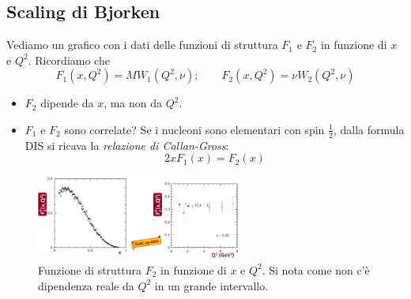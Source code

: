 \subsection{Scaling di Bjorken}
Vediamo un grafico con i dati delle funzioni di struttura $F_1$ e $F_2$ in funzione di $x$ e $Q^2$. Ricordiamo che 
\begin{equation*}
F_1(x,Q^2)=MW_1(Q^2,\nu);\qquad F_2(x,Q^2)=\nu W_2(Q^2,\nu)
\end{equation*}
\begin{itemize}
    \item $F_2$ dipende da $x$, ma non da $Q^2$.
    \item $F_1$ e $F_2$ sono correlate? Se i nucleoni sono elementari con spin $\frac{1}{2}$, dalla formula DIS si ricava la \textit{relazione di Callan-Gross}:
    \begin{equation*}
    2xF_1(x)=F_2(x)
    \end{equation*}
\end{itemize}
\begin{figure}[H]
    \centering
    \includegraphics[width=0.6\textwidth]{immagini/fig_bjorken_struct_fun.png}
    \caption{Funzione di struttura $F_2$ in funzione di $x$ e $Q^2$. Si nota come non c'è dipendenza reale da $Q^2$ in un grande intervallo.}
\end{figure}
